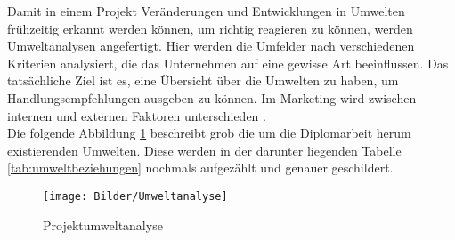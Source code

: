 Damit in einem Projekt Veränderungen und Entwicklungen in Umwelten frühzeitig erkannt werden können, um richtig reagieren zu können, werden Umweltanalysen angefertigt. Hier werden die Umfelder nach verschiedenen Kriterien analysiert, die das Unternehmen auf eine gewisse Art beeinflussen. Das tatsächliche Ziel ist es, eine Übersicht über die Umwelten zu haben, um Handlungsempfehlungen ausgeben zu können. Im Marketing wird zwischen internen und externen Faktoren unterschieden \cite[vgl.][]{Wikipedia:2023, Redaktion:2024}. \\
Die folgende Abbildung \ref{fig:umweltanalyse} beschreibt grob die um die Diplomarbeit herum existierenden Umwelten. Diese werden in der darunter liegenden Tabelle \ref{tab:umweltbeziehungen} nochmals aufgezählt und genauer geschildert.

\begin{figure}[H]
	\centering
	\texttt{[image: Bilder/Umweltanalyse]}
	\caption{Projektumweltanalyse}
	\label{fig:umweltanalyse}
\end{figure}

